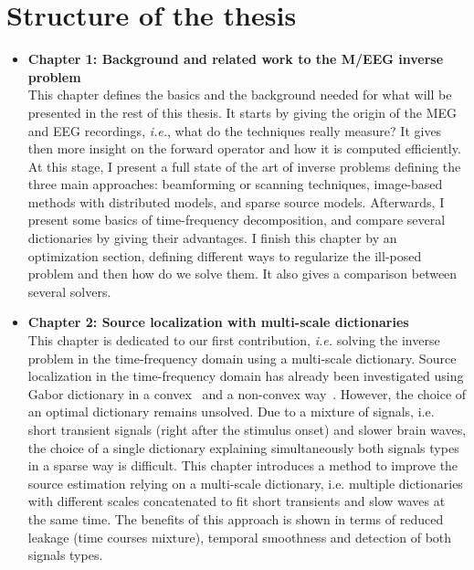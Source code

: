 \section*{Structure of the thesis}
\begin{itemize}
\item \textbf{Chapter 1: Background and related work to the
M/EEG inverse problem}\\
This chapter defines the basics and the background needed for what will be presented in the rest of this thesis. It starts by giving the origin of the MEG and EEG recordings, \textit{i.e.}, what do the techniques really measure? It gives then more insight on the forward operator and how it is computed efficiently. At this stage, I present a full state of the art of inverse problems defining the three main approaches: beamforming or scanning techniques, image-based methods with distributed models, and sparse source models. Afterwards, I present some basics of time-frequency decomposition, and compare several dictionaries by giving their advantages. I finish this chapter by an optimization section, defining different ways to regularize the ill-posed problem and then how do we solve them. It also gives a comparison between several solvers.\\

\item \textbf{Chapter 2: Source localization with multi-scale dictionaries}\\
This chapter is dedicated to our first contribution, \textit{i.e.} solving the inverse problem in the time-frequency domain using a multi-scale dictionary. 
Source localization in the time-frequency domain has already been investigated using Gabor dictionary in a convex~\cite{Gramfort_Strohmeier_Haueisen_Hamalainen_Kowalski13} and a non-convex way~\cite{Strohmeier-etal:2015}. However, the choice of an optimal dictionary remains unsolved. Due to a mixture of signals, i.e. short transient signals (right after the stimulus onset) and slower brain waves, the choice of a single dictionary explaining simultaneously both signals types in a sparse way is difficult. This chapter introduces a method to improve the source estimation relying on a multi-scale dictionary, i.e. multiple dictionaries with different scales concatenated to fit short transients and slow waves at the same time. The benefits of this approach is shown in terms of reduced leakage (time courses mixture), temporal smoothness and detection of both signals types.



\end{itemize}
